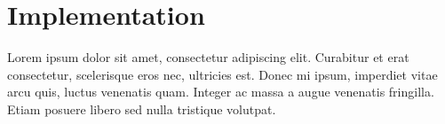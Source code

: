 \section{Implementation}\label{sec:Implementation}
Lorem ipsum dolor sit amet, consectetur adipiscing elit. Curabitur et erat consectetur, 
scelerisque eros nec, ultricies est. Donec mi ipsum, imperdiet vitae arcu quis, luctus venenatis quam. 
Integer ac massa a augue venenatis fringilla. Etiam posuere libero sed nulla tristique volutpat.